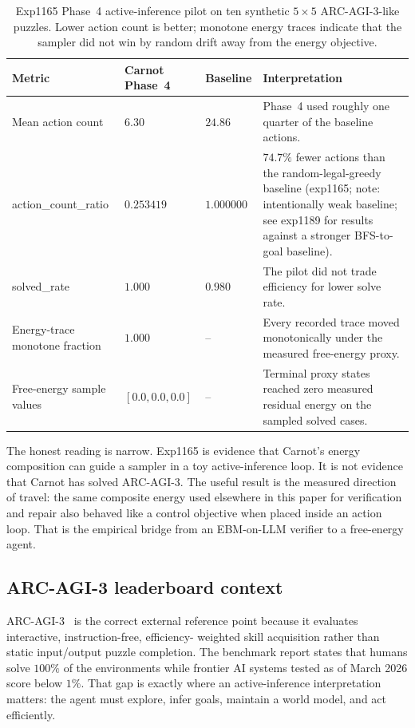 \documentclass[10pt]{article}
\begin{document}
\begin{table}[ht]
  \centering
  \caption{Exp1165 Phase~4 active-inference pilot on ten synthetic
  $5\times5$ ARC-AGI-3-like puzzles. Lower action count is better;
  monotone energy traces indicate that the sampler did not win by
  random drift away from the energy objective.}
  \label{tab:phase4-pilot}
  \begin{tabular}{p{4.2cm} p{2.6cm} p{2.6cm} p{4.2cm}}
    \toprule
    Metric & Carnot Phase~4 & Baseline & Interpretation \\
    \midrule
    Mean action count & $6.30$ & $24.86$ &
      Phase~4 used roughly one quarter of the baseline actions. \\
    action\_count\_ratio & $0.253419$ & $1.000000$ &
      $74.7\%$ fewer actions than the random-legal-greedy baseline
      (exp1165; note: intentionally weak baseline; see exp1189 for results
      against a stronger BFS-to-goal baseline). \\
    solved\_rate & $1.000$ & $0.980$ &
      The pilot did not trade efficiency for lower solve rate. \\
    Energy-trace monotone fraction & $1.000$ & -- &
      Every recorded trace moved monotonically under the measured
      free-energy proxy. \\
    Free-energy sample values & $[0.0, 0.0, 0.0]$ & -- &
      Terminal proxy states reached zero measured residual energy on
      the sampled solved cases. \\
    \bottomrule
  \end{tabular}
\end{table}

The honest reading is narrow. Exp1165 is evidence that Carnot's
energy composition can guide a sampler in a toy active-inference
loop. It is not evidence that Carnot has solved ARC-AGI-3. The
useful result is the measured direction of travel: the same
composite energy used elsewhere in this paper for verification and
repair also behaved like a control objective when placed inside an
action loop. That is the empirical bridge from an EBM-on-LLM
verifier to a free-energy agent.

\subsection{ARC-AGI-3 leaderboard context}

ARC-AGI-3~\cite{arcagi3} is the correct external reference point
because it evaluates interactive, instruction-free, efficiency-
weighted skill acquisition rather than static input/output puzzle
completion. The benchmark report states that humans solve $100\%$
of the environments while frontier AI systems tested as of March
2026 score below $1\%$. That gap is exactly where an
active-inference interpretation matters: the agent must explore,
infer goals, maintain a world model, and act efficiently.
\end{document}
